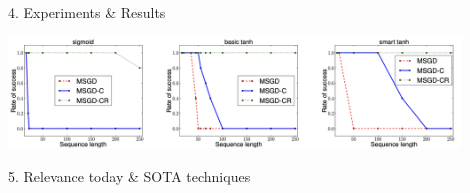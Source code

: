 \documentclass[final]{beamer}
\begin{document}
\begin{frame}[t]
\begin{columns}[t,totalwidth=\textwidth]
\begin{column}{0.35\textwidth}
\begin{block}{4. Experiments \& Results}
\begin{itemize}
  \end{itemize} %
\begin{center}
  \includegraphics[width=0.9\textwidth]{figures/results.png}
\end{center}
 \vspace{0.5cm}



    \end{block}

    \begin{block}{5. Relevance today \& SOTA techniques}


\end{block}
\end{column}
\end{columns}
\end{frame}
\end{document}
